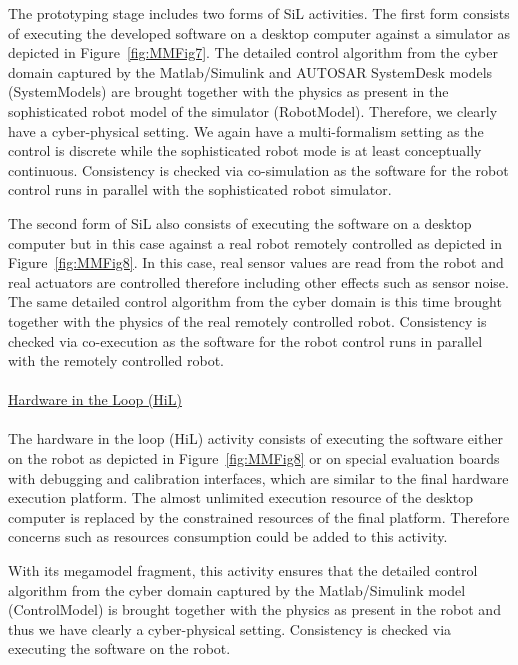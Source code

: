 The prototyping stage includes two forms of SiL activities. The first form consists of executing the developed software on a desktop computer against a simulator as depicted in Figure~\ref{fig:MMFig7}. The detailed control algorithm from the cyber domain captured by the Matlab/Simulink and AUTOSAR SystemDesk models (SystemModels) are brought together with the physics as present in the sophisticated robot model of the simulator (RobotModel). Therefore, we clearly have a cyber-physical setting. We again have a multi-formalism setting as the control is discrete while the sophisticated robot mode is at least conceptually continuous. Consistency is checked via co-simulation as the software for the robot control runs in parallel with the sophisticated robot simulator.

The second form of SiL also consists of executing the software on a desktop computer but in this case against a real robot remotely controlled as depicted in Figure~\ref{fig:MMFig8}. In this case, real sensor values are read from the robot and real actuators are controlled therefore including other effects such as sensor noise. The same detailed control algorithm from the cyber domain is this time brought together with the physics of the real remotely controlled robot. Consistency is checked via co-execution as the software for the robot control runs in parallel with the remotely controlled robot.
\\
\\
\noindent\uline{Hardware in the Loop (HiL)}
\\
\\
The hardware in the loop (HiL) activity consists of executing the software either on the robot as depicted in Figure~\ref{fig:MMFig8} or on special evaluation boards with debugging and calibration interfaces, which are
similar to the final hardware execution platform. The almost unlimited execution resource of the desktop computer is replaced by the constrained resources of the final platform. Therefore concerns such as resources consumption could be added to this activity.

With its megamodel fragment, this activity ensures that the detailed control algorithm from the cyber domain captured by the Matlab/Simulink model (ControlModel) is brought together with the physics as present in the robot and thus we have clearly a cyber-physical setting. Consistency is checked via executing the software on the robot.


